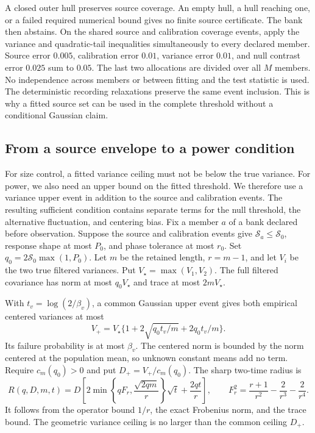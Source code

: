 A closed outer hull preserves source coverage. An empty hull, a hull reaching one, or a failed required numerical bound gives no finite source certificate. The bank then abstains. On the shared source and calibration coverage events, apply the variance and quadratic-tail inequalities simultaneously to every declared member. Source error $0.005$, calibration error $0.01$, variance error $0.01$, and null contrast error $0.025$ sum to $0.05$. The last two allocations are divided over all $M$ members. No independence across members or between fitting and the test statistic is used. The deterministic recording relaxations preserve the same event inclusion. This is why a fitted source set can be used in the complete threshold without a conditional Gaussian claim.

\subsection{From a source envelope to a power condition}\label{src16:si-power}
For size control, a fitted variance ceiling must not be below the true variance. For power, we also need an upper bound on the fitted threshold. We therefore use a variance upper event in addition to the source and calibration events. The resulting sufficient condition contains separate terms for the null threshold, the alternative fluctuation, and centering bias.
Fix a member $a$ of a bank declared before observation. Suppose the source and calibration events give $\mathcal S_a\le\mathcal S_0$, response shape at most $P_0$, and phase tolerance at most $r_0$. Set $q_0=2\mathcal S_0\max(1,P_0)$. Let $m$ be the retained length, $r=m-1$, and let $V_i$ be the two true filtered variances. Put $V_\star=\max(V_1,V_2)$. The full filtered covariance has norm at most $q_0V_\star$ and trace at most $2mV_\star$.

With $t_v=\log(2/\beta_v)$, a common Gaussian upper event gives both empirical centered variances at most
\[
 V_+=V_\star\{1+2\sqrt{q_0t_v/m}+2q_0t_v/m\}.
\]
Its failure probability is at most $\beta_v$. The centered norm is bounded by the norm centered at the population mean, so unknown constant means add no term. Require $c_m(q_0)>0$ and put $D_+=V_+/c_m(q_0)$. The sharp two-time radius is
\begin{equation}\label{src16:si-radius}
 R(q,D,m,t)=D\left[
 2\min\left\{qF_r,\frac{\sqrt{2qm}}r\right\}\sqrt t
 +\frac{2qt}r\right],\qquad
 F_r^2=\frac{r+1}{r^2}-\frac2{r^3}-\frac2{r^4}.
\end{equation}
It follows from the operator bound $1/r$, the exact Frobenius norm, and the trace bound. The geometric variance ceiling is no larger than the common ceiling $D_+$.

